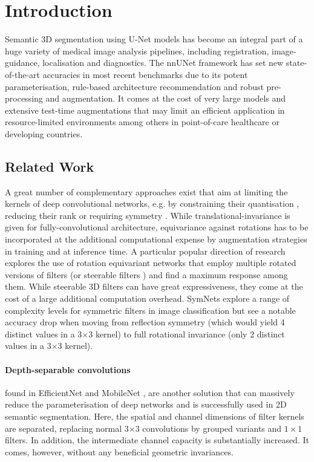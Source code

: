 \section{Introduction}
    \label{sec:intro}
    Semantic 3D segmentation using U-Net models has become an integral part of a huge variety of medical image analysis pipelines, including registration, image-guidance, localisation and diagnostics. The nnUNet framework \citep{isensee2021nnu} has set new state-of-the-art accuracies in most recent benchmarks due to its potent parameterisation, rule-based architecture recommendation and robust pre-processing and augmentation. It comes at the cost of very large models and extensive test-time augmentations that may limit an efficient application in resource-limited environments among others in point-of-care healthcare or developing countries.

    \subsection{Related Work}
        A great number of complementary approaches exist that aim at limiting the kernels of deep convolutional networks, e.g. by constraining their quantisation \citep{zhang2021medq}, reducing their rank \citep{jaderberg2014speeding} or requiring symmetry \citep{marcos2016learning}. While translational-invariance is given for fully-convolutional architecture, equivariance against rotations has to be incorporated at the additional computational expense by augmentation strategies in training and at inference time. A particular popular direction of research explores the use of rotation equivariant networks \citep{cohen2016group} that employ multiple rotated versions of filters \citep{bekkers2018roto,dieleman2016exploiting} (or steerable filters \citep{weiler20183d}) and find a maximum response among them. While steerable 3D filters can have great expressiveness, they come at the cost of a large additional computation overhead. SymNets \citep{dzhezyan2021symmetrical} explore a range of complexity levels for symmetric filters in image classification but see a notable accuracy drop when moving from reflection symmetry (which would yield 4 distinct values in a 3$\times$3 kernel) to full rotational invariance (only 2 distinct values in a 3$\times$3 kernel).

        \paragraph{Depth-separable convolutions} found in EfficientNet and MobileNet \citep{howard2019searching}, are another solution that can massively reduce the parameterisation of deep networks and is successfully used in 2D semantic segmentation. Here, the spatial and channel dimensions of filter kernels are separated, replacing normal 3$\times$3 convolutions by grouped variants and $1\times1$ filters. In addition, the intermediate channel capacity is substantially increased. It comes, however, without any beneficial geometric invariances.

